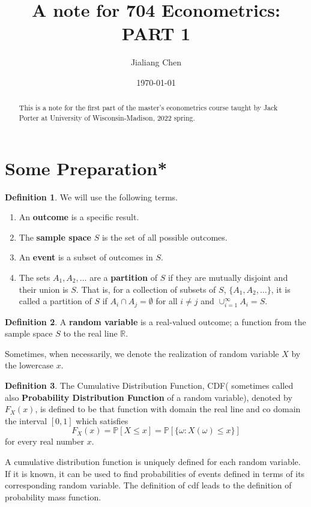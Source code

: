 \documentclass[11pt,a4paper]{amsart}
\theoremstyle{plain}
\theoremstyle{definition}
\newtheorem{definition}{Definition}
\begin{document}
\title{A note for 704 Econometrics: PART 1}
\author{Jialiang Chen} 

\date{\today}

\begin{abstract}
	This is a note for the first part of the master's econometrics course taught by Jack Porter at University of Wisconsin-Madison, 2022 spring.
\end{abstract}

\maketitle
\tableofcontents \newpage

\section{Some Preparation*}
		\begin{definition}
		We will use the following terms.
		\begin{enumerate}
			\item An \textbf{outcome} is a specific result.
			\item The \textbf{sample space} $S$ is the set of all possible outcomes.
			\item An \textbf{event} is a subset of outcomes in $S$.
			\item The sets $A_{1}, A_{2}, \dots$ are a \textbf{partition} of $S$ if they are mutually disjoint and their union is $S$. That is, for a collection of subsets of $S$, $\{A_{1}, A_{2}, \dots\}$, it is called a partition of $S$ if $A_{i} \cap A_{j} = \emptyset$ for all $i \ne j$ and $\cup_{i=1}^{\infty} A_{i} = S$.
		\end{enumerate}
	\end{definition}
	\begin{definition}\label{random variable}
		A \textbf{random variable} is a real-valued outcome; a function from the sample space $S$ to the real line $\mathbb{R}$.
	\end{definition}
	Sometimes, when necessarily, we denote the realization of random variable $X$ by the lowercase $x$.
	
	\begin{definition}\label{cdf}
		The Cumulative Distribution Function, CDF( sometimes called also \textbf{Probability Distribution Function} of a random variable), denoted by $F_{X}(x)$, is defined to be that function with domain the real line and co domain the interval $[0,1]$ which satisfies
		\[	F_{X}(x) = \mathbb{P}[X \leq x] = \mathbb{P}[\{ \omega \colon X(\omega) \leq x\}]		\]
		for every real number $x$.  
	\end{definition}
	A cumulative distribution function is uniquely defined for each random variable. If it is known, it can be used to find probabilities of events defined in terms of its corresponding random variable. The definition of cdf leads to the definition of probability mass function.
	
\end{document}
